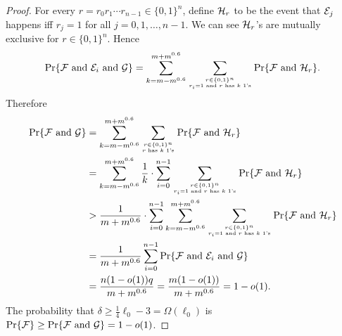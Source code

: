 \documentclass[11pt]{article}
\begin{document}
\begin{proof}
For every $r=r_0r_1\cdots r_{n-1}\in\{0,1\}^n$, define ${\cal H}_r$ to be the event that ${\cal E}_j$ happens iff $r_j=1$ for all $j=0,1,\ldots,n-1$. We can see ${\cal H}_r$'s are mutually exclusive for $r\in\{0,1\}^n$. Hence \[\Pr\{{\cal F}\text{ and }{\cal E}_i\text{ and }{\cal G}\}=\sum_{k=m-m^{0.6}}^{m+m^{0.6}}\sum_{r\in\{0,1\}^n\atop r_i=1\text{ and }r\text{ has $k$ $1$'s}}\Pr\{{\cal F}\text{ and }{\cal H}_r\}.\] Therefore
\begin{align*}
\Pr\{{\cal F}\text{ and }{\cal G}\}&=\sum_{k=m-m^{0.6}}^{m+m^{0.6}}\sum_{r\in\{0,1\}^n\atop r\text{ has $k$ $1$'s}}\Pr\{{\cal F}\text{ and }{\cal H}_r\}\\
&=\sum_{k=m-m^{0.6}}^{m+m^{0.6}}\frac{1}{k}\cdot\sum_{i=0}^{n-1}\sum_{r\in\{0,1\}^n\atop r_i=1\text{ and }r\text{ has $k$ $1$'s}}\Pr\{{\cal F}\text{ and }{\cal H}_r\} \\
&>\frac{1}{m+m^{0.6}}\cdot\sum_{i=0}^{n-1}\sum_{k=m-m^{0.6}}^{m+m^{0.6}}\sum_{r\in\{0,1\}^n\atop r_i=1\text{ and }r\text{ has $k$ $1$'s}}\Pr\{{\cal F}\text{ and }{\cal H}_r\} \\
&=\frac{1}{m+m^{0.6}}\sum_{i=0}^{n-1}\Pr\{{\cal F}\text{ and }{\cal E}_i\text{ and }{\cal G}\} \\
&=\frac{n(1-o(1))q}{m+m^{0.6}}=\frac{m(1-o(1))}{m+m^{0.6}}=1-o(1).
\end{align*}
The probability that $\delta\geq\frac{1}{4}\ell_0-3=\Omega(\ell_0)$ is $\Pr\{{\cal F}\}\geq\Pr\{{\cal F}\text{ and }{\cal G}\}=1-o(1)$.
%

\end{proof}
\end{document}
